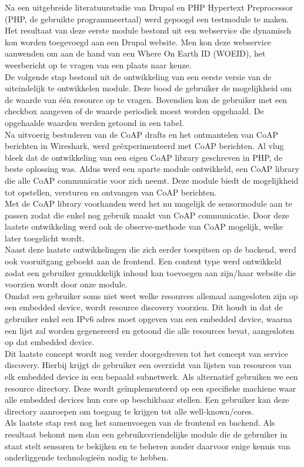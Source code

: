 Na een uitgebreide literatuurstudie van Drupal en PHP Hypertext Preprocessor (PHP, de gebruikte programmeertaal) werd gepoogd een testmodule te maken. Het resultaat van deze eerste module bestond uit een webservice die dynamisch kon worden toegevoegd aan een Drupal website. Men kon deze webservice aanwenden om aan de hand van een Where On Earth ID (WOEID), het weerbericht op te vragen van een plaats naar keuze.\\
De volgende stap bestond uit de ontwikkeling van een eerste versie van de uiteindelijk te ontwikkelen module. Deze bood de gebruiker de mogelijkheid om de waarde van \'{e}\'{e}n resource op te vragen. Bovendien kon de gebruiker met een checkbox aangeven of de waarde periodiek moest worden opgehaald. De opgehaalde waarden werden getoond in een tabel.\\
Na uitvoerig bestuderen van de CoAP drafts en het ontmantelen van CoAP berichten in Wireshark, werd ge\"{e}xperimenteerd met CoAP berichten. Al vlug bleek dat de ontwikkeling van een eigen CoAP library geschreven in PHP, de beste oplossing was. Aldus werd een aparte module ontwikkeld, een CoAP library die alle CoAP communicatie voor zich neemt. Deze module biedt de mogelijkheid tot opstellen, versturen en ontvangen van CoAP berichten.\\
Met de CoAP library voorhanden werd het nu mogelijk de sensormodule aan te passen zodat die enkel nog gebruik maakt van CoAP communicatie. Door deze laatste ontwikkeling werd ook de observe-methode van CoAP mogelijk, welke later toegelicht wordt.\\
Naast deze laatste ontwikkelingen die zich eerder toespitsen op de backend, werd ook vooruitgang geboekt aan de frontend. Een content type werd ontwikkeld zodat een gebruiker gemakkelijk inhoud kan toevoegen aan zijn/haar website die voorzien wordt door onze module.\\
Omdat een gebruiker soms niet weet welke resources allemaal aangesloten zijn op een embedded device, wordt resource discovery voorzien. Dit houdt in dat de gebruiker enkel een IPv6 adres moet opgeven van een embedded device, waarna een lijst zal worden gegenereerd en getoond die alle resources bevat, aangesloten op dat embedded device.\\
Dit laatste concept wordt nog verder doorgedreven tot het concept van service discovery. Hierbij krijgt de gebruiker een overzicht van lijsten van resources van elk embedded device in een bepaald subnetwerk. Als alternatief gebruiken we een resource directory. Deze wordt ge\"{i}mplementeerd op een specifieke machiene waar alle embedded devices hun core op beschikbaar stellen. Een gebruiker kan deze directory aanroepen om toegang te krijgen tot alle well-known/cores.\\
Als laatste stap rest nog het samenvoegen van de frontend en backend. Als resultaat bekomt men dan een gebruiksvriendelijke module die de gebruiker in staat stelt sensoren te bekijken en te beheren zonder daarvoor enige kennis van onderliggende technologie\"{e}n nodig te hebben.


